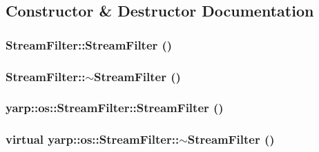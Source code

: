 \subsection{Constructor \& Destructor Documentation}
\hypertarget{classyarp_1_1os_1_1_stream_filter_a687a3082652cb3163619fa04bfe9db1f}{
\subsubsection[{StreamFilter}]{\setlength{\rightskip}{0pt plus 5cm}StreamFilter::StreamFilter ()}}
\label{classyarp_1_1os_1_1_stream_filter_a687a3082652cb3163619fa04bfe9db1f}
\hypertarget{classyarp_1_1os_1_1_stream_filter_a39cc5195a93b8146c2f9117298f97581}{
\subsubsection[{$\sim$StreamFilter}]{\setlength{\rightskip}{0pt plus 5cm}StreamFilter::$\sim$StreamFilter ()}}
\label{classyarp_1_1os_1_1_stream_filter_a39cc5195a93b8146c2f9117298f97581}
\hypertarget{classyarp_1_1os_1_1_stream_filter_aa60e6108b7ab7a492d2265a00fe09773}{
\subsubsection[{StreamFilter}]{\setlength{\rightskip}{0pt plus 5cm}yarp::os::StreamFilter::StreamFilter ()}}
\label{classyarp_1_1os_1_1_stream_filter_aa60e6108b7ab7a492d2265a00fe09773}
\hypertarget{classyarp_1_1os_1_1_stream_filter_a024da71ac25badd8895898bc057e3488}{
\subsubsection[{$\sim$StreamFilter}]{\setlength{\rightskip}{0pt plus 5cm}virtual yarp::os::StreamFilter::$\sim$StreamFilter ()}}
\label{classyarp_1_1os_1_1_stream_filter_a024da71ac25badd8895898bc057e3488}


